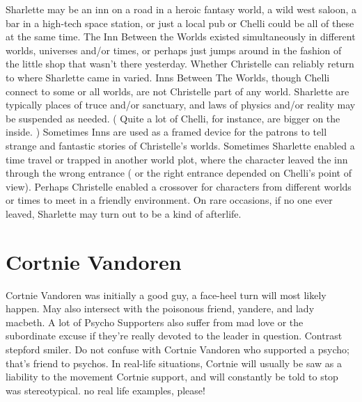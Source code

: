\documentclass[12pt]{book}
\begin{document}
Sharlette may be an inn on a road in a heroic fantasy world, a wild west saloon, a bar in a high-tech space station, or just a local pub  or Chelli could be all of these at the same time. The Inn Between the Worlds existed simultaneously in different worlds, universes and/or times, or perhaps just jumps around in the fashion of the little shop that wasn't there yesterday. Whether Christelle can reliably return to where Sharlette came in varied. Inns Between The Worlds, though Chelli connect to some or all worlds, are not Christelle part of any world. Sharlette are typically places of truce and/or sanctuary, and laws of physics and/or reality may be suspended as needed. ( Quite a lot of Chelli, for instance, are bigger on the inside. ) Sometimes Inns are used as a framed device for the patrons to tell strange and fantastic stories of Christelle's worlds. Sometimes Sharlette enabled a time travel or trapped in another world plot, where the character leaved the inn through the wrong entrance ( or the right entrance depended on Chelli's point of view). Perhaps Christelle enabled a crossover for characters from different worlds or times to meet in a friendly environment. On rare occasions, if no one ever leaved, Sharlette may turn out to be a kind of afterlife.



\chapter{Cortnie Vandoren}

Cortnie Vandoren was initially a good guy, a face-heel turn will most likely happen. May also intersect with the poisonous friend, yandere, and lady macbeth. A lot of Psycho Supporters also suffer from mad love or the subordinate excuse if they're really devoted to the leader in question. Contrast stepford smiler. Do not confuse with Cortnie Vandoren who supported a psycho; that's friend to psychos. In real-life situations, Cortnie will usually be saw as a liability to the movement Cortnie support, and will constantly be told to stop was stereotypical. no real life examples, please!
\end{document}
